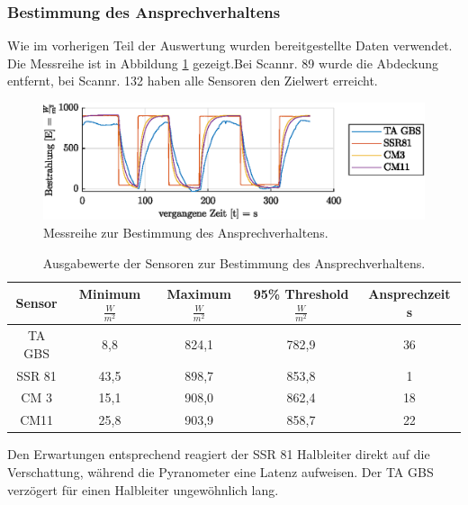 \subsubsection{Bestimmung des Ansprechverhaltens}
Wie im vorherigen Teil der Auswertung wurden bereitgestellte Daten verwendet. Die Messreihe ist in Abbildung \ref{fig:response} gezeigt.Bei Scannr. 89 wurde die Abdeckung entfernt, bei Scannr. 132 haben alle Sensoren den Zielwert erreicht.
\begin{figure}[H]
	\centering
	\includegraphics[width=\textwidth]{../DATA/Messreihe_Ansprechzeit.eps}
	\caption[Messreihe zur Bestimmung des Ansprechverhaltens.]{Messreihe zur Bestimmung des Ansprechverhaltens.}
	\label{fig:response}
\end{figure}

\begin{table}[H]
\centering
\caption{Ausgabewerte der Sensoren zur Bestimmung des Ansprechverhaltens.}
	\label{tab:response}
	\begin{tabular}{ccccc}
		\toprule
		
		\textbf{Sensor} & \textbf{Minimum} $\frac{W}{m^2}$ & \textbf{Maximum} $\frac{W}{m^2}$& \textbf{95\% Threshold} $\frac{W}{m^2}$ & \textbf{Ansprechzeit} s\\
		\midrule
		TA GBS & 8,8 & 824,1 & 782,9 & 36 \\
		SSR 81 & 43,5 & 898,7 & 853,8 & 1 \\
		CM 3 & 15,1 & 908,0 & 862,4 & 18 \\
		CM11 & 25,8 & 903,9 & 858,7 & 22 \\
		\bottomrule
	\end{tabular}
\end{table}
Den Erwartungen entsprechend reagiert der SSR 81 Halbleiter direkt auf die Verschattung, während die Pyranometer eine Latenz aufweisen. Der TA GBS verzögert für einen Halbleiter ungewöhnlich lang.

